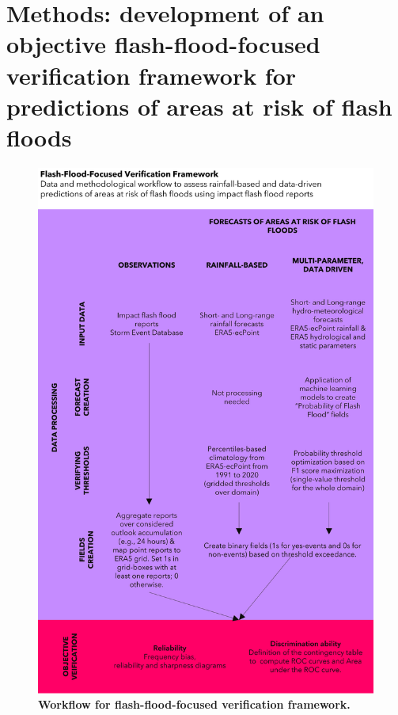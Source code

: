 \section{Methods: development of an objective flash-flood-focused verification framework for predictions of areas at risk of flash floods}
\label{flash_flood_focused_verification_rainfall_based_ff_METHODS}

\begin{figure}[htbp]
\centering
\includegraphics[width=\textwidth]{workflow_verif_framework.png}
\caption{\textbf{Workflow for flash-flood-focused verification framework.}}
\label{fig:sed_reports}
\end{figure}

